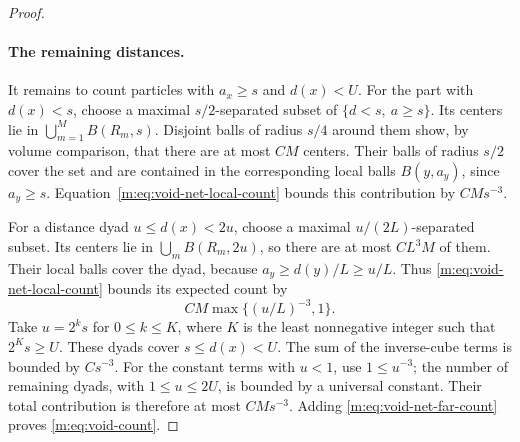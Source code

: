 \begin{proof}
\paragraph{The remaining distances.}
It remains to count particles with $a_x\ge s$ and $d(x)<U$.
For the part with $d(x)<s$, choose a maximal $s/2$-separated subset
of $\{d<s,\ a\ge s\}$. Its centers lie in
$\bigcup_{m=1}^M B(R_m,s)$. Disjoint balls of radius $s/4$ around
them show, by volume comparison, that there are at most $CM$ centers.
Their balls of radius $s/2$ cover the set and are contained in the
corresponding local balls $B(y,a_y)$, since $a_y\ge s$.
Equation~\eqref{m:eq:void-net-local-count} bounds this contribution by
$CMs^{-3}$.

For a distance dyad $u\le d(x)<2u$, choose a maximal
$u/(2L)$-separated subset. Its centers lie in
$\bigcup_m B(R_m,2u)$, so there are at most $CL^3M$ of them.
Their local balls cover the dyad, because $a_y\ge d(y)/L\ge u/L$.
Thus \eqref{m:eq:void-net-local-count} bounds its expected count by
\[
 CM\max\{(u/L)^{-3},1\}.
\]
Take $u=2^ks$ for $0\le k\le K$, where $K$ is the least nonnegative
integer such that $2^Ks\ge U$. These dyads cover $s\le d(x)<U$.
The sum of the inverse-cube terms is bounded by $Cs^{-3}$.
For the constant terms with $u<1$, use $1\le u^{-3}$; the number of
remaining dyads, with $1\le u\le2U$, is bounded by a universal constant.
Their total contribution is therefore at most $CMs^{-3}$.
Adding \eqref{m:eq:void-net-far-count} proves
\eqref{m:eq:void-count}.
\end{proof}
